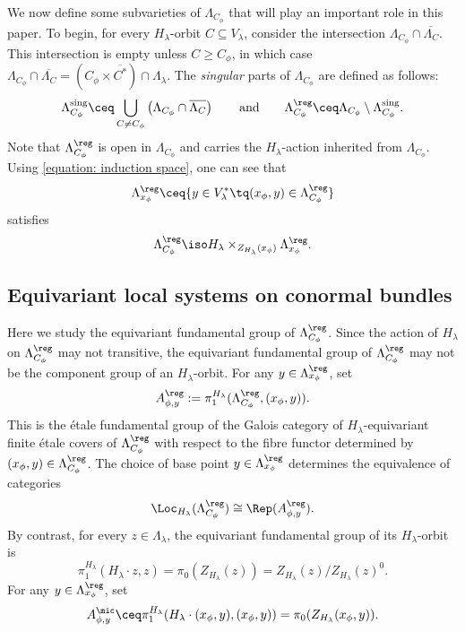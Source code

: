 \documentclass[11pt,letterpaper]{amsart}
\numberwithin{equation}{section}
\begin{document}
We now define some subvarieties of $\Lambda_{C_\phi}$ that will play an important role in this paper.
To begin, for every $H_\lambda$-orbit $C\subseteq V_\lambda$, consider the intersection 
$
\Lambda_{C_\phi} \cap \overline{\Lambda_{C}}$.
This intersection is empty unless $C\geq C_\phi$, in which case 
$
\Lambda_{C_\phi} \cap \overline{\Lambda_{C}}
=
(C_\phi \times \overline{C^*} ) \cap \Lambda_\lambda.
$ 
The {\it singular} parts of $\Lambda_{C_\phi}$ are defined as follows:
\begin{equation}\label{definition: reg}
\Lambda_{C_\phi}^\mathrm{sing}
\ceq
\bigcup_{C \ne C_\phi} \left( \Lambda_{C_\phi} \cap \overline{\Lambda_{C}} \right)
\qquad\textrm{and}\qquad
\Lambda_{C_\phi}^\reg
\ceq
\Lambda_{C_\phi} \setminus \Lambda_{C_\phi}^\mathrm{sing}.
\end{equation}
Note that $\Lambda_{C_\phi}^\reg$ is open in $\Lambda_{C_\phi}$ and carries the $H_\lambda$-action inherited from $\Lambda_{C_\phi}$.
Using \eqref{equation: induction space}, one can see that 
\[
\Lambda^\reg_{x_\phi} \ceq \{ y\in V^*_\lambda \tq (x_\phi,y) \in \Lambda^\reg_{C_\phi} \}
\]
satisfies 
\[
\Lambda^\reg_{C_\phi} \iso H_\lambda\times_{Z_{H_\lambda}(x_\phi)}\Lambda_{x_\phi}^\reg.
\]


\subsection{Equivariant local systems on conormal bundles}\label{subsection: ELS}

Here we study the equivariant fundamental group of $\Lambda_{C_\phi}^\reg$.
Since the action of $H_{\lambda}$ on $\Lambda_{C_\phi}^\reg$ may not transitive, the equivariant fundamental group of $\Lambda_{C_\phi}^\reg$ may not be the component group of an $H_\lambda$-orbit. 
For any $y \in \Lambda_{x_\phi}^\reg$, set
\[
A^{\reg}_{\phi,y}
:= \pi_1^{H_{\lambda}}(\Lambda_{C_\phi}^{\reg},(x_\phi,y)).
\]
This is the \'etale fundamental group of the Galois category of $H_\lambda$-equivariant finite \'etale covers of $\Lambda^\reg_{C_\phi}$ with respect to the fibre functor determined by $(x_\phi,y)\in \Lambda_{C_\phi}^\reg$.
The choice of base point $y\in \Lambda_{x_\phi}^\reg$ determines the equivalence of categories
\begin{equation}\label{equation:gen}
\Loc_{H_{\lambda}}(\Lambda_{C_\phi}^{\reg}) 
\cong
\Rep(A_{\phi,y}^{\reg}).
\end{equation}
By contrast, for every $z\in \Lambda_\lambda$, the equivariant fundamental group of its $H_\lambda$-orbit is
\[
\pi_1^{H_\lambda}(H_\lambda\cdot z,z) 
= \pi_0( Z_{H_\lambda}(z) )
= Z_{H_\lambda}(z)/Z_{H_\lambda}(z)^0.
\]
For any $y\in {\Lambda^\reg_{x_\phi}}$, set 
\[
A^\mic_{\phi,y} \ceq \pi_1^{H_\lambda}(H_\lambda\cdot (x_\phi,y),(x_\phi,y)) 
= \pi_0(Z_{H_\lambda}(x_\phi,y)).
\]
\end{document}
